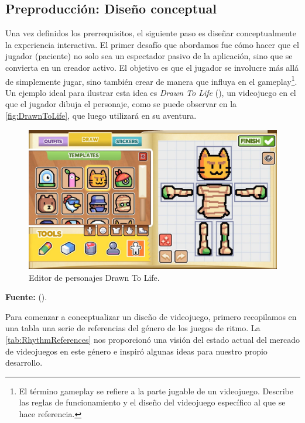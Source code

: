 \subsection{Preproducción: Diseño conceptual}

Una vez definidos los prerrequisitos, el siguiente paso es diseñar conceptualmente la experiencia interactiva. El primer desafío que abordamos fue cómo hacer que el jugador (paciente) no solo sea un espectador pasivo de la aplicación, sino que se convierta en un creador activo. El objetivo es que el jugador se involucre más allá de simplemente jugar, sino también crear de manera que influya en el gameplay\footnote{El término gameplay se refiere a la parte jugable de un videojuego. Describe las reglas de funcionamiento y el diseño del videojuego específico al que se hace referencia.}. Un ejemplo ideal para ilustrar esta idea es \textit{Drawn To Life} (\cite{DTL:2007}), un videojuego en el que el jugador dibuja el personaje, como se puede observar en la \autoref{fig:DrawnToLife}, que luego utilizará en su aventura.

\begin{figure}[h!]
	\centering
	\includegraphics[width=0.7\linewidth]{Figuras/Desarrollo/DrawnToLife.jpg}
	\caption{Editor de personajes Drawn To Life.}
	\label{fig:DrawnToLife}
	\vspace{-30pt}
\end{figure}

\begin{center}
	\textbf{Fuente:} \citeauthor{DTL:2020} (\citeyear{DTL:2020}).
\end{center}

Para comenzar a conceptualizar un diseño de videojuego, primero recopilamos en una tabla una serie de referencias del género de los juegos de ritmo. La \autoref{tab:RhythmReferences} nos proporcionó una visión del estado actual del mercado de videojuegos en este género e inspiró algunas ideas para nuestro propio desarrollo.

